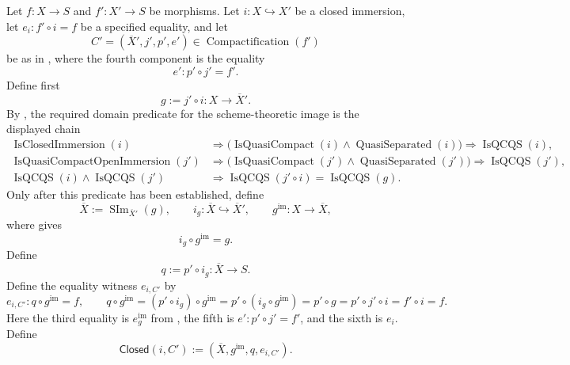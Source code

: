 \begin{definition}
  \label{def:nagata-closed-subscheme-compactification}
  \lean{}

  Let $f\colon X\to S$ and $f'\colon X'\to S$ be morphisms.  Let
  $i\colon X\hookrightarrow X'$ be a closed immersion, let
  $e_i\colon f'\circ i=f$ be a specified equality, and let
  \[
    C'=(\overline X',j',p',e')
      \in\operatorname{Compactification}(f')
  \]
  be as in , where the fourth component is
  the equality
  \[
    e'\colon p'\circ j'=f'.
  \]
  Define first
  \[
    g:=j'\circ i\colon X\to\overline X'.
  \]
  By ,
  the required domain predicate
  for the scheme-theoretic image is the displayed chain
  \[
  \begin{aligned}
    \operatorname{IsClosedImmersion}(i)
      &\Longrightarrow
        \bigl(
          \operatorname{IsQuasiCompact}(i)\wedge
          \operatorname{QuasiSeparated}(i)
        \bigr)
       \Longrightarrow\operatorname{IsQCQS}(i),\\
    \operatorname{IsQuasiCompactOpenImmersion}(j')
      &\Longrightarrow
        \bigl(
          \operatorname{IsQuasiCompact}(j')\wedge
          \operatorname{QuasiSeparated}(j')
        \bigr)
       \Longrightarrow\operatorname{IsQCQS}(j'),\\
    \operatorname{IsQCQS}(i)\wedge\operatorname{IsQCQS}(j')
      &\Longrightarrow
        \operatorname{IsQCQS}(j'\circ i)
       =\operatorname{IsQCQS}(g).
  \end{aligned}
  \]
  Only after this predicate has been established, define
  \[
    \overline X:=\operatorname{SIm}_{\overline X'}(g),
    \qquad
    i_g\colon\overline X\hookrightarrow\overline X',
    \qquad
    g^{\mathrm{im}}\colon X\to\overline X,
  \]
  where  gives
  \[
    i_g\circ g^{\mathrm{im}}=g.                                  \tag{CSC0}
  \]
  Define
  \[
    q:=p'\circ i_g\colon\overline X\to S.
  \]
  Define the equality witness $e_{i,C'}$ by
  \[
    e_{i,C'}\colon q\circ g^{\mathrm{im}}=f,
    \qquad
    q\circ g^{\mathrm{im}}
      =(p'\circ i_g)\circ g^{\mathrm{im}}
      =p'\circ(i_g\circ g^{\mathrm{im}})
      =p'\circ g
      =p'\circ j'\circ i
      =f'\circ i=f.
  \]
  Here the third equality is $e_g^{\mathrm{im}}$ from
  , the fifth is
  $e'\colon p'\circ j'=f'$, and the sixth is $e_i$.  Define
  \[
    \mathsf{Closed}(i,C'):=
      (\overline X,g^{\mathrm{im}},q,e_{i,C'}).
  \]
\end{definition}

